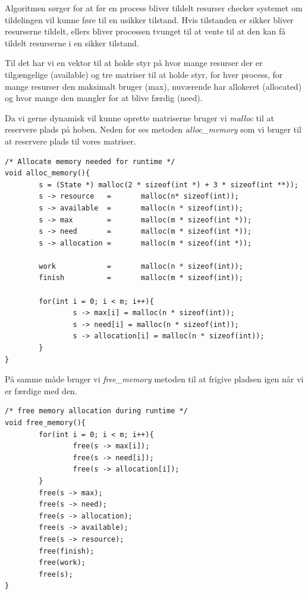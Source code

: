 \documentclass[danish]{report}
\begin{document}
Algoritmen sørger for at før en process bliver tildelt resurser checker systemet om tildelingen vil kunne føre til en usikker tilstand. Hvis tilstanden er sikker bliver resurserne tildelt, ellers bliver processen tvunget til at vente til at den kan få tildelt resurserne i en sikker tilstand.

Til det har vi en vektor til at holde styr på hvor mange resurser der er tilgængelige (available) og tre matriser til at holde styr, for hver process, for mange resurser den maksimalt bruger (max), nuværende har allokeret (allocated) og hvor mange den mangler for at blive færdig (need).

Da vi gerne dynamisk vil kunne oprette matriserne bruger vi \textit{malloc} 
til at reservere plads på hoben. Neden for ses metoden \textit{alloc\_memory} som vi bruger til at reservere plads til vores matriser. 

\begin{lstlisting}
/* Allocate memory needed for runtime */
void alloc_memory(){
        s = (State *) malloc(2 * sizeof(int *) + 3 * sizeof(int **));
        s -> resource   =       malloc(n* sizeof(int));
        s -> available  =       malloc(n * sizeof(int));
        s -> max        =       malloc(m * sizeof(int *));
        s -> need       =       malloc(m * sizeof(int *));
        s -> allocation =       malloc(m * sizeof(int *));

        work            =       malloc(n * sizeof(int));
        finish          =       malloc(m * sizeof(int));

        for(int i = 0; i < m; i++){
                s -> max[i] = malloc(n * sizeof(int));
                s -> need[i] = malloc(n * sizeof(int));
                s -> allocation[i] = malloc(n * sizeof(int));
        }
}
\end{lstlisting}

På samme måde bruger vi \textit{free\_memory} metoden  til at frigive pladsen igen når vi er færdige med den.
\begin{lstlisting}
/* free memory allocation during runtime */
void free_memory(){
        for(int i = 0; i < m; i++){
                free(s -> max[i]);
                free(s -> need[i]);
                free(s -> allocation[i]);
        }
        free(s -> max);
        free(s -> need);
        free(s -> allocation);
        free(s -> available);
        free(s -> resource);
        free(finish);
        free(work);
        free(s);
}
\end{lstlisting}
\end{document}
